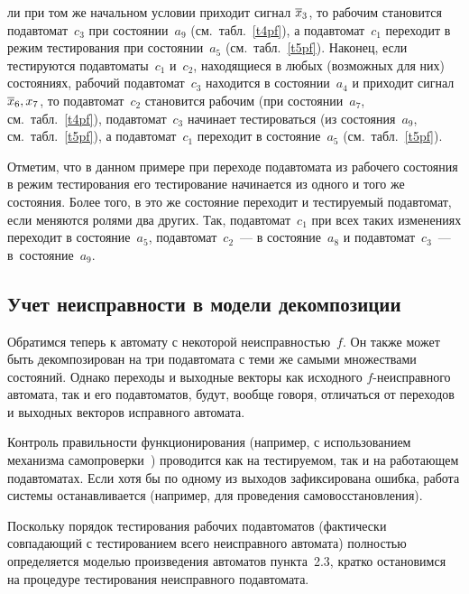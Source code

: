 \begin{multicols}{2}


\noindent
ли при том же начальном условии приходит сигнал $\overline x_3$,
то рабочим становится подавтомат~$c_3$ при со\-сто\-янии~$a_9$ (см.\  табл.~\ref{t4pf}),
а подавтомат~$c_1$
переходит в режим тестирования при со\-сто\-янии~$a_5$
(см.\ табл.~\ref{t5pf}).
Наконец, если тестируются подавтоматы~$c_1$ и~$c_2$, находящиеся в любых
(возможных для них) состояниях, рабочий подавтомат~$c_3$ находится в
со\-сто\-янии~$a_4$ и приходит сигнал $\overline x_6,x_7$, то подавтомат~$c_2$
становится рабочим (при со\-сто\-янии~$a_7$, см.\ табл.~\ref{t4pf}), подавтомат~$c_3$
начинает тестироваться (из со\-сто\-яния~$a_9$, см.\ табл.~\ref{t5pf}), а подавтомат~$c_1$
переходит в со\-сто\-яние~$a_5$ (см.\ табл.~\ref{t5pf}).

Отметим, что в данном примере при переходе подавтомата из рабочего
состояния в режим тестирования его тестирование начинается из одного и
того же состояния.
Более того, в это же состояние переходит и тестируемый подавтомат,
если меняются ролями два других.
Так, подавтомат~$c_1$ при всех таких изменениях переходит в
со\-сто\-яние~$a_5$, подавтомат~$c_2$~--- в со\-сто\-яние~$a_8$ и подавтомат~$c_3$~--- в~со\-сто\-яние~$a_9$.



\subsection{Учет неисправности в модели декомпозиции}

Обратимся теперь к автомату с некоторой неисправностью~$f$.
Он также может быть декомпозирован на три подавтомата с теми же самыми
множествами состояний.
Однако переходы и выходные векторы как исходного $f$-неисправного автомата,
так и его подавтоматов, будут, вообще говоря, отличаться от переходов
и выходных векторов исправного автомата.

Контроль правильности функционирования (например, с использованием механизма
самопроверки~\cite{1}) проводится как на тестируемом, так и на работающем
подавтоматах.
Если хотя бы по одному из выходов зафиксирована ошибка, работа системы
останавливается (например, для проведения самовосстановления).

Поскольку порядок тестирования рабочих под\-ав\-то\-ма\-тов (фактически
совпадающий с тестированием всего неисправного автомата) пол\-ностью
определяется моделью произведения автоматов пункта~2.3, кратко остановимся
на процедуре тес\-ти\-ро\-ва\-ния неисправного подавтомата.


\end{multicols}
